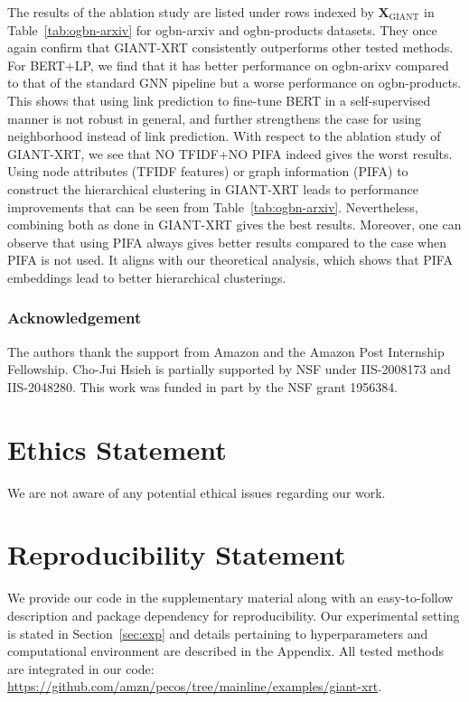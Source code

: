\documentclass{article} \usepackage{iclr2022_conference,times}
\begin{document}
The results of the ablation study are listed under rows indexed by $\mathbf{X}_{\text{GIANT}}$ in Table~\ref{tab:ogbn-arxiv} for ogbn-arxiv and ogbn-products datasets. They once again confirm that GIANT-XRT consistently outperforms other tested methods. For BERT+LP, we find that it has better performance on ogbn-arixv compared to that of the standard GNN pipeline but a worse performance on ogbn-products. This shows that using link prediction to fine-tune BERT in a self-supervised manner is not robust in general, and further strengthens the case for using neighborhood instead of link prediction. With respect to the ablation study of GIANT-XRT, we see that NO TFIDF+NO PIFA indeed gives the worst results. Using node attributes (TFIDF features) or graph information (PIFA) to construct the hierarchical clustering in GIANT-XRT leads to performance improvements that can be seen from Table~\ref{tab:ogbn-arxiv}. Nevertheless, combining both as done in GIANT-XRT gives the best results. Moreover, one can observe that using PIFA always gives better results compared to the case when PIFA is not used. It aligns with our theoretical analysis, which shows that PIFA embeddings lead to better hierarchical clusterings.







\subsubsection*{Acknowledgement}
The authors thank the support from Amazon and the Amazon Post Internship Fellowship. Cho-Jui Hsieh is partially supported by NSF under IIS-2008173 and IIS-2048280. This work was funded in part by the NSF grant 1956384.

\section{Ethics Statement}
We are not aware of any potential ethical issues regarding our work.
\section{Reproducibility Statement}
We provide our code in the supplementary material along with an easy-to-follow description and package dependency for reproducibility. Our experimental setting is stated in Section~\ref{sec:exp} and details pertaining to hyperparameters and computational environment are described in the Appendix. All tested methods are integrated in our code:
\url{https://github.com/amzn/pecos/tree/mainline/examples/giant-xrt}.
\end{document}

